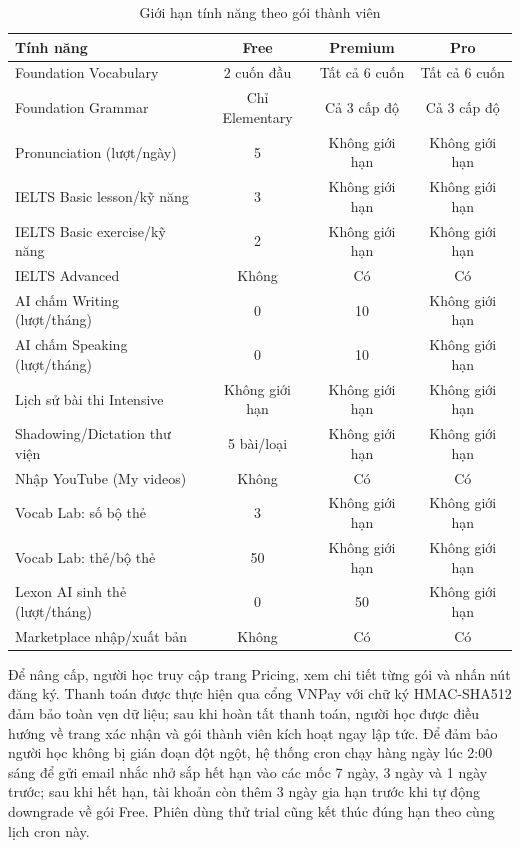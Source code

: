 \begin{table}[H]
\centering
    \caption{Giới hạn tính năng theo gói thành viên}
    \label{tab:feature-limits}

\begin{tabularx}{\linewidth}{|X|c|c|c|}
\hline
\textbf{Tính năng} & Free & Premium & Pro \\
\hline
Foundation Vocabulary & 2 cuốn đầu & Tất cả 6 cuốn & Tất cả 6 cuốn \\
Foundation Grammar & Chỉ Elementary & Cả 3 cấp độ & Cả 3 cấp độ \\
Pronunciation (lượt/ngày) & 5 & Không giới hạn & Không giới hạn \\
IELTS Basic lesson/kỹ năng & 3 & Không giới hạn & Không giới hạn \\
IELTS Basic exercise/kỹ năng & 2 & Không giới hạn & Không giới hạn \\
IELTS Advanced & Không & Có & Có \\
AI chấm Writing (lượt/tháng) & 0 & 10 & Không giới hạn \\
AI chấm Speaking (lượt/tháng) & 0 & 10 & Không giới hạn \\
Lịch sử bài thi Intensive & Không giới hạn & Không giới hạn & Không giới hạn \\
Shadowing/Dictation thư viện & 5 bài/loại & Không giới hạn & Không giới hạn \\
Nhập YouTube (My videos) & Không & Có & Có \\
Vocab Lab: số bộ thẻ & 3 & Không giới hạn & Không giới hạn \\
Vocab Lab: thẻ/bộ thẻ & 50 & Không giới hạn & Không giới hạn \\
Lexon AI sinh thẻ (lượt/tháng) & 0 & 50 & Không giới hạn \\
Marketplace nhập/xuất bản & Không & Có & Có \\
\hline
\end{tabularx}
\end{table}

Để nâng cấp, người học truy cập trang Pricing, xem chi tiết từng gói và nhấn nút đăng ký. Thanh toán được thực hiện qua cổng VNPay với chữ ký HMAC-SHA512 đảm bảo toàn vẹn dữ liệu; sau khi hoàn tất thanh toán, người học được điều hướng về trang xác nhận và gói thành viên kích hoạt ngay lập tức. Để đảm bảo người học không bị gián đoạn đột ngột, hệ thống cron chạy hàng ngày lúc 2:00 sáng để gửi email nhắc nhở sắp hết hạn vào các mốc 7 ngày, 3 ngày và 1 ngày trước; sau khi hết hạn, tài khoản còn thêm 3 ngày gia hạn trước khi tự động downgrade về gói Free. Phiên dùng thử trial cũng kết thúc đúng hạn theo cùng lịch cron này.

